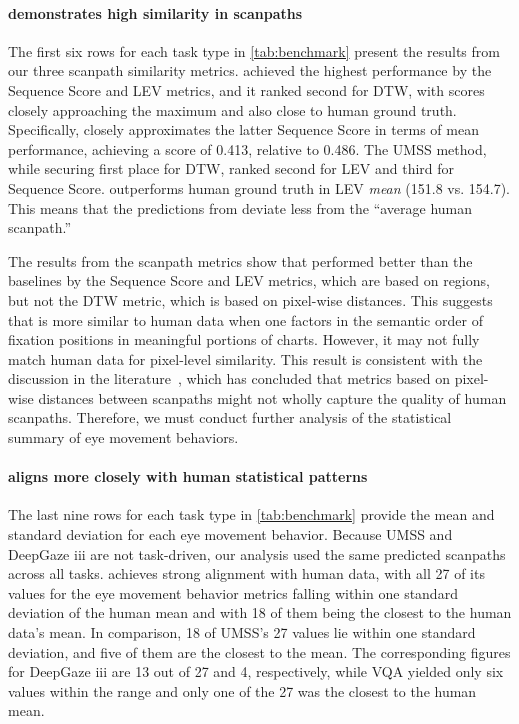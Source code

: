 \paragraph{\name demonstrates high similarity in scanpaths}

The first six rows for each task type in \autoref{tab:benchmark} present the results from our three scanpath similarity metrics.
\name achieved the highest performance by the Sequence Score and LEV metrics, and it ranked second for DTW, with scores closely approaching the maximum and also close to human ground truth. 
Specifically, \name closely approximates the latter Sequence Score in terms of mean performance, achieving a score of 0.413, relative to 0.486.
The UMSS method, while securing first place for DTW, ranked second for LEV and third for Sequence Score.
\name outperforms human ground truth in LEV \textit{mean} (151.8 vs. 154.7). This means that the predictions from \name deviate less from the ``average human scanpath.''

The results from the scanpath metrics show that \name performed better than the baselines by the Sequence Score and LEV metrics, which are based on regions, but not the DTW metric, which is based on pixel-wise distances. This suggests that \name is more similar to human data when one factors in the semantic order of fixation positions in meaningful portions of charts. However, it may not fully match human data for pixel-level similarity.
This result is consistent with the discussion in the literature~\cite{wang2023scanpath}, which has concluded that metrics based on pixel-wise distances between scanpaths might not wholly capture the quality of human scanpaths. Therefore, we must conduct further analysis of the statistical summary of eye movement behaviors.

\paragraph{\name aligns more closely with human statistical patterns}

The last nine rows for each task type in \autoref{tab:benchmark} provide the mean and standard deviation for each eye movement behavior. 
Because UMSS and DeepGaze iii are not task-driven, our analysis used the same predicted scanpaths across all tasks.
\name achieves strong alignment with human data, with all 27 of its values for the eye movement behavior metrics falling within one standard deviation of the human mean and with 18 of them being the closest to the human data's mean. In comparison, 18 of UMSS's 27 values lie within one standard deviation, and five of them are the closest to the mean. The corresponding figures for DeepGaze iii are 13 out of 27 and 4, respectively, while VQA yielded only six values within the range and only one of the 27 was the closest to the human mean.

